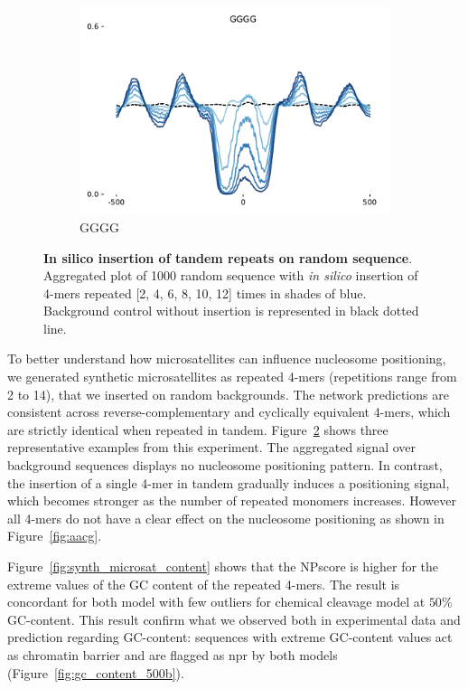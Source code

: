 \documentclass[11pt]{book}
\begin{document}
\begin{figure}[htbp]
\begin{subfigure}[t]{0.32\textwidth}
    \includegraphics[width=\linewidth]{Figures/synthetic_genomics_simple/GGGG.pdf}
        \caption{GGGG}
        \label{fig:accg}
    \end{subfigure}
    \caption{\textbf{In silico insertion of tandem repeats on random sequence}. Aggregated plot of 1000 random sequence with \textit{in silico} insertion of 4-mers repeated [2, 4, 6, 8, 10, 12] times in shades of blue. Background control without insertion is represented in black dotted line.}
    \label{fig:kmers_synthetics}
\end{figure} 

To better understand how microsatellites can influence nucleosome positioning, we generated synthetic microsatellites as repeated 4-mers (repetitions range from 2 to 14), that we inserted on random backgrounds. The network predictions are consistent across reverse-complementary and cyclically equivalent 4-mers, which are strictly identical when repeated in tandem.
Figure~\ref{fig:kmers_synthetics} shows three representative examples from this experiment. The aggregated signal over background sequences displays no nucleosome positioning pattern. In contrast, the insertion of a single 4-mer in tandem gradually induces a positioning signal, which becomes stronger as the number of repeated monomers increases. However all 4-mers do not have a clear effect on the nucleosome positioning as shown in Figure~\ref{fig:aacg}.

Figure~\ref{fig:synth_microsat_content} shows that the NPscore is higher for the extreme values of the GC content of the repeated 4-mers. The result is concordant for both model with few outliers for chemical cleavage model at $50\%$ GC-content. This result confirm what we observed both in experimental data and prediction regarding GC-content: sequences with extreme GC-content values act as chromatin barrier and are flagged as \gls{npr} by both models (Figure~\ref{fig:gc_content_500b}). 
\end{document}
